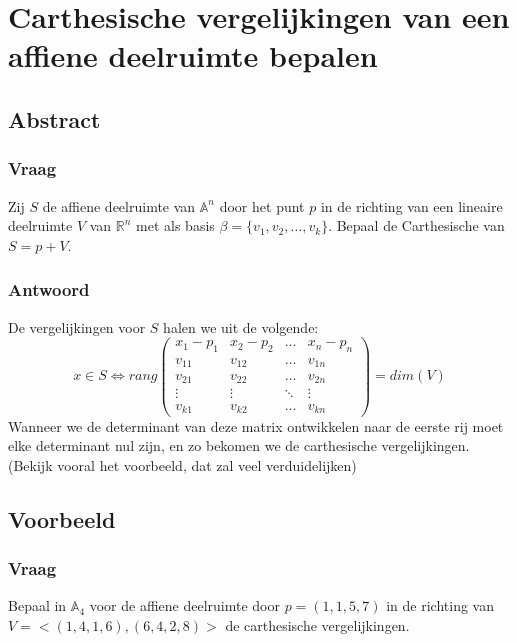 \documentclass[main.tex]{subfiles}
\begin{document}
\newpage
\section{Carthesische vergelijkingen van een affiene deelruimte bepalen}
\subsection{Abstract}
\subsubsection{Vraag}
\begin{center}
  Zij $S$ de affiene deelruimte van $\mathbb{A}^{n}$ door het punt $p$ in de richting van een lineaire deelruimte $V$ van $\mathbb{R}^{n}$ met als basis $\beta=\{v_{1},v_{2},\dotsc,v_{k}\}$.
  Bepaal de Carthesische van $S=p+V$.
\end{center}

\subsubsection{Antwoord}
De vergelijkingen voor $S$ halen we uit de volgende:
\[
x \in S \Leftrightarrow
rang
\begin{pmatrix}
  x_{1}-p_{1} & x_{2}-p_{2} & \hdots & x_{n}-p_{n} \\
  v_{11} & v_{12} & \hdots & v_{1n} \\
  v_{21} & v_{22} & \hdots & v_{2n} \\
  \vdots & \vdots & \ddots & \vdots \\ 
  v_{k1} & v_{k2} & \hdots & v_{kn}
\end{pmatrix}
= dim(V)
\]
Wanneer we de determinant van deze matrix ontwikkelen naar de eerste rij moet elke determinant nul zijn, en zo bekomen we de carthesische vergelijkingen.
(Bekijk vooral het voorbeeld, dat zal veel verduidelijken)

\subsection{Voorbeeld}
\subsubsection{Vraag}
\begin{center}
  Bepaal in $\mathbb{A}_{4}$ voor de affiene deelruimte door $p=(1,1,5,7)$ in de richting van $V=<(1,4,1,6),(6,4,2,8)>$ de carthesische vergelijkingen.
\end{center}
\end{document}
